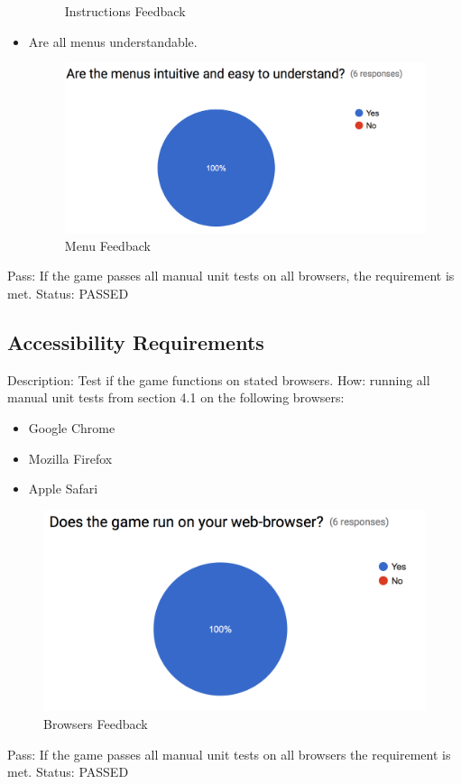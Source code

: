 \documentclass{article}
\begin{document}
\begin{itemize}
\begin{figure}[H]
	\caption{Instructions Feedback}
\end{figure}
\item Are all menus understandable.
\begin{figure}[H]
	\centering
	\includegraphics[width=\textwidth]{./Figures/15.png}
	\caption{Menu Feedback}
\end{figure}
\end{itemize}
Pass:  If the game passes all manual unit tests on all browsers, the requirement
 is met.\newline
Status: PASSED


\subsection{Accessibility Requirements}
\label{sec:4.3}
Description: Test if the game functions on stated browsers.
How: running all manual unit tests from section 4.1 on the following browsers:
\begin{itemize}
\item Google Chrome
\item Mozilla Firefox
\item Apple Safari
\end{itemize}
\begin{figure}[H]
	\centering
	\includegraphics[width=\textwidth]{./Figures/8.png}
	\caption{Browsers Feedback}
\end{figure}
Pass:  If the game passes all manual unit tests on all browsers the requirement
 is met.\newline
Status: PASSED
\end{document}
